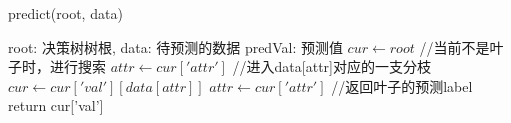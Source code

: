 \documentclass[11pt]{article}
\begin{document}
\begin{CJK}{UTF8}{gbsn}
\begin{algorithm}
\begin{algorithmic}
\caption{predict(root, data)}
\REQUIRE root:  决策树树根, data: 待预测的数据
\ENSURE predVal: 预测值
\STATE $cur \gets root$
\STATE //当前不是叶子时，进行搜索
\STATE $attr \gets cur['attr']$
\STATE //进入data[attr]对应的一支分枝
\STATE	$cur \gets cur['val'][data[attr]]$
\STATE  $attr \gets cur['attr']$
\ENDWHILE
\STATE //返回叶子的预测label
\STATE return cur['val']
\end{algorithmic}
\end{algorithm}



\end{CJK}
\end{document}
